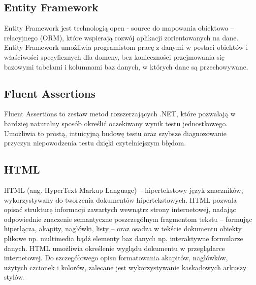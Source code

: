 \documentclass[12pt,a4paper]{article}
\begin{document}
		\subsection{Entity Framework}		 
		 	\indent Entity Framework jest technologią open - source do mapowania obiektowo – relacyjnego (ORM), które wspierają rozwój aplikacji zorientowanych na dane.
		 	Entity Framework umożliwia programistom pracę z danymi w postaci obiektów i właściwości specyficznych dla domeny, bez konieczności przejmowania się bazowymi
		 	tabelami i kolumnami baz danych, w których dane są przechowywane. 

		\subsection{Fluent Assertions}
			\indent Fluent Assertions to zestaw metod rozszerzających .NET, które pozwalają
			w bardziej naturalny sposób określić oczekiwany wynik testu jednostkowego.
			Umożliwia to prostą, intuicyjną budowę testu oraz szybsze diagnozowanie przyczyn
			niepowodzenia testu dzięki czytelniejszym błędom.
		\subsection{HTML}
			\indent HTML (ang. HyperText Markup Language) – hipertekstowy język znaczników, wykorzystywany do tworzenia dokumentów hipertekstowych. HTML pozwala opisać
				strukturę informacji zawartych wewnątrz strony internetowej, nadając odpowiednie znaczenie semantyczne poszczególnym fragmentom tekstu – formując hiperłącza,
				akapity, nagłówki, listy – oraz osadza w tekście dokumentu obiekty plikowe np. multimedia bądź elementy baz danych np. interaktywne formularze danych.
				HTML umożliwia określenie wyglądu dokumentu w przeglądarce internetowej. Do szczegółowego opisu formatowania akapitów, nagłówków, użytych czcionek i kolorów,
				zalecane jest wykorzystywanie kaskadowych arkuszy stylów.
				 
\end{document}
